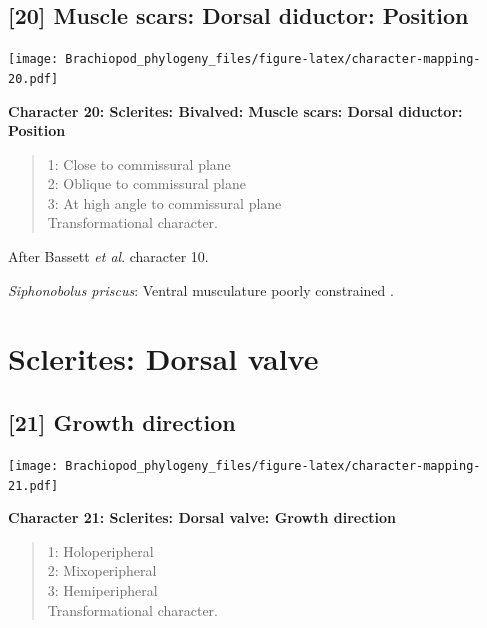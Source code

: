 \documentclass[openany]{book}
\theoremstyle{definition}
\theoremstyle{definition}
\theoremstyle{definition}
\theoremstyle{remark}
\begin{document}
\hypertarget{muscle-scars-dorsal-diductor-position}{%
\subsection*{{[}20{]} Muscle scars: Dorsal diductor:
Position}\label{muscle-scars-dorsal-diductor-position}}

\texttt{[image: Brachiopod\_phylogeny\_files/figure-latex/character-mapping-20.pdf]}

\textbf{Character 20: Sclerites: Bivalved: Muscle scars: Dorsal
diductor: Position}

\begin{quote}
1: Close to commissural plane\\
2: Oblique to commissural plane\\
3: At high angle to commissural plane\\
Transformational character.
\end{quote}

After Bassett \emph{et al}.
\citeyearpar{Bassett2001Functionalmorphology} character 10.

\emph{Siphonobolus priscus}: Ventral musculature poorly constrained
\citep{Williams2000BrachiopodaLinguliformea, Popov2009Earlyontogeny}.

\hypertarget{sclerites-dorsal-valve}{%
\section{Sclerites: Dorsal valve}\label{sclerites-dorsal-valve}}

\hypertarget{growth-direction}{%
\subsection*{{[}21{]} Growth direction}\label{growth-direction}}

\texttt{[image: Brachiopod\_phylogeny\_files/figure-latex/character-mapping-21.pdf]}

\textbf{Character 21: Sclerites: Dorsal valve: Growth direction}

\begin{quote}
1: Holoperipheral\\
2: Mixoperipheral\\
3: Hemiperipheral\\
Transformational character.
\end{quote}
\end{document}
